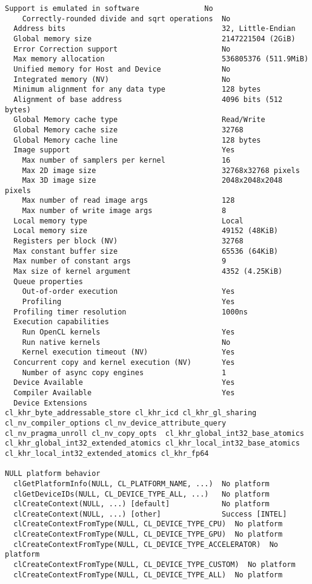 \documentclass{article}
\begin{document}
\begin{lstlisting}[language={}]
    Support is emulated in software               No
    Correctly-rounded divide and sqrt operations  No
  Address bits                                    32, Little-Endian
  Global memory size                              2147221504 (2GiB)
  Error Correction support                        No
  Max memory allocation                           536805376 (511.9MiB)
  Unified memory for Host and Device              No
  Integrated memory (NV)                          No
  Minimum alignment for any data type             128 bytes
  Alignment of base address                       4096 bits (512 bytes)
  Global Memory cache type                        Read/Write
  Global Memory cache size                        32768
  Global Memory cache line                        128 bytes
  Image support                                   Yes
    Max number of samplers per kernel             16
    Max 2D image size                             32768x32768 pixels
    Max 3D image size                             2048x2048x2048 pixels
    Max number of read image args                 128
    Max number of write image args                8
  Local memory type                               Local
  Local memory size                               49152 (48KiB)
  Registers per block (NV)                        32768
  Max constant buffer size                        65536 (64KiB)
  Max number of constant args                     9
  Max size of kernel argument                     4352 (4.25KiB)
  Queue properties                                
    Out-of-order execution                        Yes
    Profiling                                     Yes
  Profiling timer resolution                      1000ns
  Execution capabilities                          
    Run OpenCL kernels                            Yes
    Run native kernels                            No
    Kernel execution timeout (NV)                 Yes
  Concurrent copy and kernel execution (NV)       Yes
    Number of async copy engines                  1
  Device Available                                Yes
  Compiler Available                              Yes
  Device Extensions                               cl_khr_byte_addressable_store cl_khr_icd cl_khr_gl_sharing cl_nv_compiler_options cl_nv_device_attribute_query cl_nv_pragma_unroll cl_nv_copy_opts  cl_khr_global_int32_base_atomics cl_khr_global_int32_extended_atomics cl_khr_local_int32_base_atomics cl_khr_local_int32_extended_atomics cl_khr_fp64 

NULL platform behavior
  clGetPlatformInfo(NULL, CL_PLATFORM_NAME, ...)  No platform
  clGetDeviceIDs(NULL, CL_DEVICE_TYPE_ALL, ...)   No platform
  clCreateContext(NULL, ...) [default]            No platform
  clCreateContext(NULL, ...) [other]              Success [INTEL]
  clCreateContextFromType(NULL, CL_DEVICE_TYPE_CPU)  No platform
  clCreateContextFromType(NULL, CL_DEVICE_TYPE_GPU)  No platform
  clCreateContextFromType(NULL, CL_DEVICE_TYPE_ACCELERATOR)  No platform
  clCreateContextFromType(NULL, CL_DEVICE_TYPE_CUSTOM)  No platform
  clCreateContextFromType(NULL, CL_DEVICE_TYPE_ALL)  No platform
  \end{lstlisting}
\end{document}

